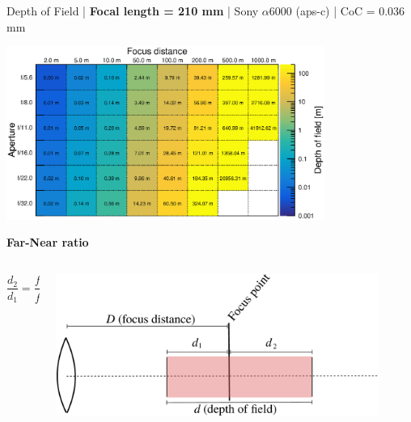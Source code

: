 \documentclass[aspectratio=169]{beamer}
\begin{document}
\begin{frame}[plain]{}
  \vspace{1ex}
  \centering
  Depth of Field | {\bf Focal length = 210 mm} |  Sony $\alpha$\hspace{0.1em}6000 (aps-c) | CoC = 0.036 mm
  
  \includegraphics[center,width=0.78\textwidth]{img/depth-of-field_focl210.eps}
\end{frame}


\begin{frame}[plain]{}
  \vspace{3ex}
  \begin{center} \LARGE \bf
    Far-Near ratio
  \end{center}

  \begin{columns}
  \begin{column}{0.40\textwidth}
  {\Large 
    $$\mathit{\frac{d_2}{d_1} = \frac{f^2 + NcD}{f^2 - NcD}}$$
  }
  \end{column}
  \begin{column}{0.60\textwidth}
    \center
    \includegraphics[width=0.90\textwidth]{img/lensfocus-dof.pdf}
  \end{column}
  \end{columns}

\end{frame}
\end{document}
